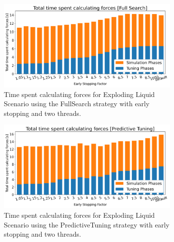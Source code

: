 \documentclass[conference]{IEEEtran}
\begin{document}
\begin{figure}[h]
    \centering
    \begin{subfigure}[b]{\columnwidth}
        \includegraphics[width=\columnwidth]{../data/explodingLiquid/cluster/fullSearchEvidenceBased_2threads/analytics/total_time_average.png}

        \caption{Time spent calculating forces for Exploding Liquid Scenario using the FullSearch strategy with early stopping and two threads.}
        \label{fig:full_search}
    \end{subfigure}

    \begin{subfigure}[b]{\columnwidth}
        \centering

        \includegraphics[width=\columnwidth]{../data/explodingLiquid/cluster/predictiveTuningEvidenceBased_2threads/analytics/total_time_average.png}

        \caption{Time spent calculating forces for Exploding Liquid Scenario using the PredictiveTuning strategy with early stopping and two threads.}
        \label{fig:predictive_tuning}
    \end{subfigure}

    \begin{subfigure}[b]{\columnwidth}
        \centering


\end{subfigure}
\end{figure}
\end{document}
